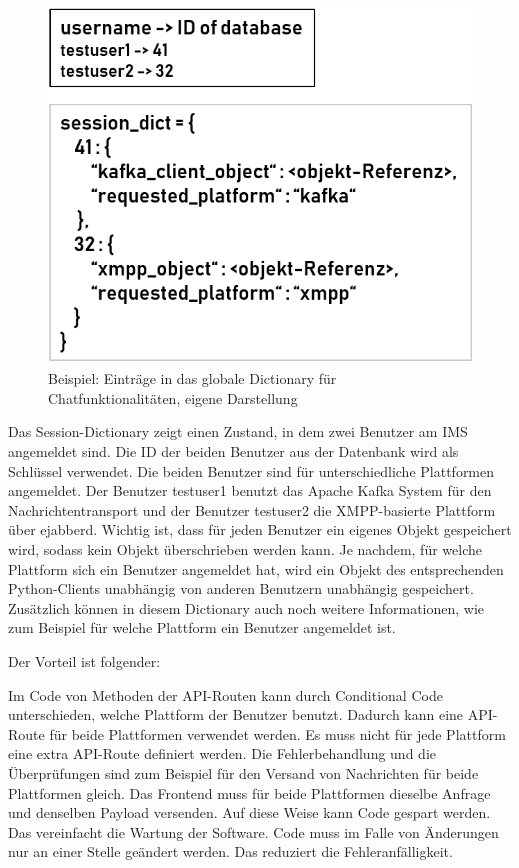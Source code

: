 \documentclass[a4paper,titlepage,halfparskip,12pt]{scrreprt}
\begin{document}
\begin{onehalfspacing}
\begin{figure}[h]
	\centering
	\includegraphics[width=.6\textwidth]{images/sessionDict}
	\caption{Beispiel: Einträge in das globale Dictionary für Chatfunktionalitäten, eigene Darstellung}
	\label{img:sessionDict}
\end{figure}

Das Session-Dictionary zeigt einen Zustand, in dem zwei Benutzer am \acs{IMS} angemeldet sind. Die ID der beiden Benutzer aus der Datenbank wird als Schlüssel verwendet. Die beiden Benutzer sind für unterschiedliche Plattformen angemeldet. Der Benutzer testuser1 benutzt das Apache Kafka System für den Nachrichtentransport und der Benutzer testuser2 die \acs{XMPP}-basierte Plattform über ejabberd. Wichtig ist, dass für jeden Benutzer ein eigenes Objekt gespeichert wird, sodass kein Objekt überschrieben werden kann. Je nachdem, für welche Plattform sich ein Benutzer angemeldet hat, wird ein Objekt des entsprechenden Python-Clients unabhängig von anderen Benutzern unabhängig gespeichert. Zusätzlich können in diesem Dictionary auch noch weitere Informationen, wie zum Beispiel für welche Plattform ein Benutzer angemeldet ist.

Der Vorteil ist folgender:

Im Code von Methoden der \acs{API}-Routen kann durch Conditional Code unterschieden, welche Plattform der Benutzer benutzt. Dadurch kann eine \acs{API}-Route für beide Plattformen verwendet werden. Es muss nicht für jede Plattform eine extra \acs{API}-Route definiert werden. Die Fehlerbehandlung und die Überprüfungen sind zum Beispiel für den Versand von Nachrichten für beide Plattformen gleich. Das Frontend muss für beide Plattformen dieselbe Anfrage und denselben Payload versenden. Auf diese Weise kann Code gespart werden. Das vereinfacht die Wartung der Software. Code muss im Falle von Änderungen nur an einer Stelle geändert werden. Das reduziert die Fehleranfälligkeit.


\end{onehalfspacing}
\end{document}

